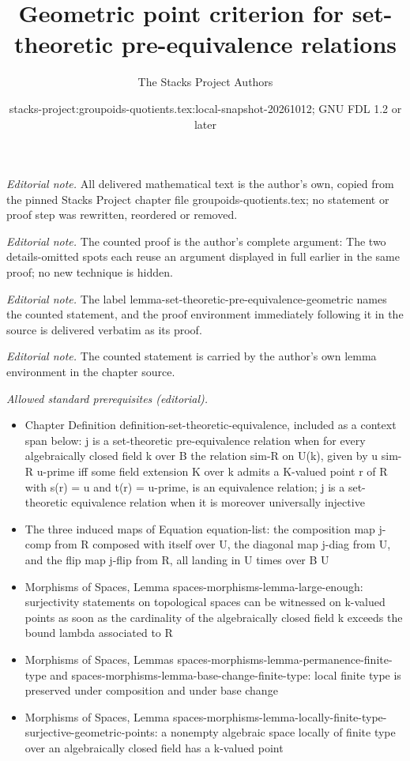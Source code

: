 \documentclass[10pt,a4paper]{amsart}
\title{Geometric point criterion for set-theoretic pre-equivalence relations}
\author{The Stacks Project Authors}
\date{stacks-project:groupoids-quotients.tex:local-snapshot-20261012; GNU FDL 1.2 or later}
\theoremstyle{plain}
\theoremstyle{definition}
\theoremstyle{remark}
\numberwithin{equation}{subsection}
\begin{document}
\maketitle
\noindent\textit{Editorial note.} All delivered mathematical text is the author's own, copied from the pinned Stacks Project chapter file groupoids-quotients.tex; no statement or proof step was rewritten, reordered or removed.\par\medskip
\noindent\textit{Editorial note.} The counted proof is the author's complete argument: The two details-omitted spots each reuse an argument displayed in full earlier in the same proof; no new technique is hidden.\par\medskip
\noindent\textit{Editorial note.} The label lemma-set-theoretic-pre-equivalence-geometric names the counted statement, and the proof environment immediately following it in the source is delivered verbatim as its proof.\par\medskip
\noindent\textit{Editorial note.} The counted statement is carried by the author's own lemma environment in the chapter source.\par\medskip
\noindent\textit{Allowed standard prerequisites (editorial).}\begin{itemize}
\item Chapter Definition definition-set-theoretic-equivalence, included as a context span below: j is a set-theoretic pre-equivalence relation when for every algebraically closed field k over B the relation sim-R on U(k), given by u sim-R u-prime iff some field extension K over k admits a K-valued point r of R with s(r) = u and t(r) = u-prime, is an equivalence relation; j is a set-theoretic equivalence relation when it is moreover universally injective
\item The three induced maps of Equation equation-list: the composition map j-comp from R composed with itself over U, the diagonal map j-diag from U, and the flip map j-flip from R, all landing in U times over B U
\item Morphisms of Spaces, Lemma spaces-morphisms-lemma-large-enough: surjectivity statements on topological spaces can be witnessed on k-valued points as soon as the cardinality of the algebraically closed field k exceeds the bound lambda associated to R
\item Morphisms of Spaces, Lemmas spaces-morphisms-lemma-permanence-finite-type and spaces-morphisms-lemma-base-change-finite-type: local finite type is preserved under composition and under base change
\item Morphisms of Spaces, Lemma spaces-morphisms-lemma-locally-finite-type-surjective-geometric-points: a nonempty algebraic space locally of finite type over an algebraically closed field has a k-valued point
\end{itemize}\medskip
\end{document}
